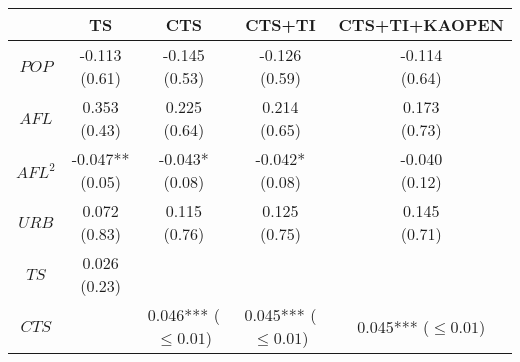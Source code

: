 \begin{tabular}{ccccc}
\toprule
                                               &                                   TS &                                  CTS &                               CTS+TI &                        CTS+TI+KAOPEN \\
\midrule
                                         $POP$ &            \makecell{-0.113\\(0.61)} &            \makecell{-0.145\\(0.53)} &            \makecell{-0.126\\(0.59)} &            \makecell{-0.114\\(0.64)} \\
                                         $AFL$ &             \makecell{0.353\\(0.43)} &             \makecell{0.225\\(0.64)} &             \makecell{0.214\\(0.65)} &             \makecell{0.173\\(0.73)} \\
                                       $AFL^2$ &          \makecell{-0.047**\\(0.05)} &           \makecell{-0.043*\\(0.08)} &           \makecell{-0.042*\\(0.08)} &            \makecell{-0.040\\(0.12)} \\
                                         $URB$ &             \makecell{0.072\\(0.83)} &             \makecell{0.115\\(0.76)} &             \makecell{0.125\\(0.75)} &             \makecell{0.145\\(0.71)} \\
                                          $TS$ &             \makecell{0.026\\(0.23)} &                                      &                                      &                                      \\
                                         $CTS$ &                                      &   \makecell{0.046***\\($\leq 0.01$)} &   \makecell{0.045***\\($\leq 0.01$)} &   \makecell{0.045***\\($\leq 0.01$)} \\

\end{tabular}

